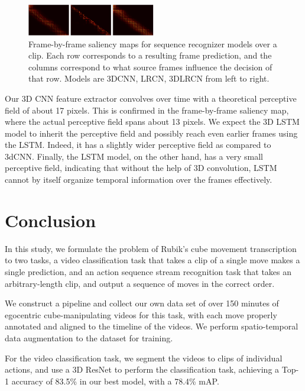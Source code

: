 \documentclass[10pt,twocolumn,letterpaper]{article}
\begin{document}
\begin{figure}[]
    \centering
    \includegraphics[width=0.5\textwidth]{fbf1.png}

    \caption{Frame-by-frame saliency maps for sequence recognizer models over a clip. Each row corresponds to a resulting frame prediction, and the columns correspond to what source frames influence the decision of that row. Models are 3DCNN, LRCN, 3DLRCN from left to right.}
    \label{fig:saliency-fbf}
\end{figure}

Our 3D CNN feature extractor convolves over time with a theoretical perceptive field of about 17 pixels. This is confirmed in the frame-by-frame saliency map, where the actual perceptive field spans about 13 pixels.  We expect the 3D LSTM model to inherit the perceptive field and possibly reach even earlier frames using the LSTM. Indeed, it has a slightly wider perceptive field as compared to 3dCNN. Finally, the LSTM model, on the other hand, has a very small perceptive field, indicating that without the help of 3D convolution, LSTM cannot by itself organize temporal information over the frames effectively.


\section{Conclusion}

In this study, we formulate the problem of Rubik's cube movement transcription to two tasks, a video classification task that takes a clip of a single move makes a single prediction, and an action sequence stream recognition task that takes an arbitrary-length clip, and output a sequence of moves in the correct order. 

We construct a pipeline and collect our own data set of over 150 minutes of egocentric cube-manipulating videos for this task, with each move properly annotated and aligned to the timeline of the videos. We perform spatio-temporal data augmentation to the dataset for training.

For the video classification task, we segment the videos to clips of individual actions, and use a 3D ResNet to perform the classification task, achieving a Top-1 accuracy of 83.5\% in our best model, with a 78.4\% mAP.
\end{document}

